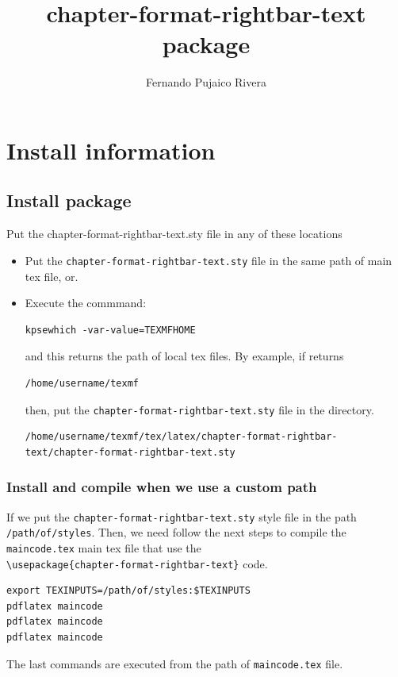 \documentclass[a4paper,10pt]{book}
\title{chapter-format-rightbar-text package}
\author{Fernando Pujaico Rivera}
\begin{document}
\maketitle

\clearpage
\pagestyle{empty} %
\tableofcontents


\chapter{Install information}\label{ch:install}

\section{Install package}\label{sec:install}
Put the chapter-format-rightbar-text.sty file in any of these locations
\begin{itemize}
\item Put the \texttt{chapter-format-rightbar-text.sty} file in the same path of main tex file, or.
\item Execute the commmand:
\begin{lstlisting}[style=mystyle]
kpsewhich -var-value=TEXMFHOME
\end{lstlisting}
and this returns the path of local tex files. By example, if returns 
\begin{lstlisting}[style=mystyle]
/home/username/texmf
\end{lstlisting}
then, put the \texttt{chapter-format-rightbar-text.sty} file in the directory.
\begin{lstlisting}[style=mystyle]
/home/username/texmf/tex/latex/chapter-format-rightbar-text/chapter-format-rightbar-text.sty
\end{lstlisting}
\end{itemize}
\subsection{Install and compile when we use a custom path}
If we put the \texttt{chapter-format-rightbar-text.sty} style file in the path \texttt{/path/of/styles}.
Then, we need follow the next steps to compile the \texttt{maincode.tex} main tex file that use the\\%
\noindent\verb|\usepackage{chapter-format-rightbar-text}| code.
\begin{lstlisting}[style=mystyle]
export TEXINPUTS=/path/of/styles:$TEXINPUTS
pdflatex maincode
pdflatex maincode
pdflatex maincode
\end{lstlisting}
The last commands are executed from the path of \texttt{maincode.tex} file.
\end{document}
